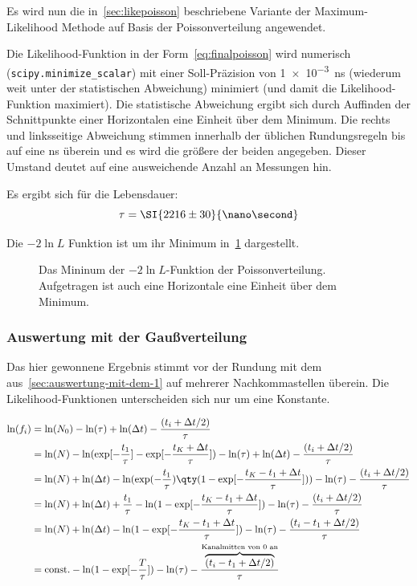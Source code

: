 \documentclass[slug=LM, room=Andreas-Schubert-Bau\,\ K\ 1A, supervisor=Anne-Sophie\ Berthold, coursedate=13.\ 12.\ 2019]{../../Lab_Report_LaTeX/lab_report}
\begin{document}
Es wird nun die in~\ref{sec:likepoisson} beschriebene Variante der
Maximum-Likelihood Methode auf Basis der Poissonverteilung angewendet.

Die Likelihood-Funktion in der Form~\ref{eq:finalpoisson} wird
numerisch (\verb|scipy.minimize_scalar|) mit einer Soll-Pr\"azision
von \SI{1e-3}{\nano\second} (wiederum weit unter der statistischen
Abweichung) minimiert (und damit die Likelihood-Funktion maximiert). Die
statistische Abweichung ergibt sich durch Auffinden der Schnittpunkte
einer Horizontalen eine Einheit \"uber dem Minimum. Die rechts und
linksseitige Abweichung stimmen innerhalb der \"ublichen
Rundungsregeln bis auf eine \si{\nano\second} \"uberein und es wird
die gr\"o\ss{}ere der beiden angegeben. Dieser Umstand deutet auf eine
ausweichende Anzahl an Messungen hin.

Es ergibt sich f\"ur die Lebensdauer:
\begin{equation}
  \label{eq:result-poisson}
  \tau = \SI{2216\pm 30}{\nano\second}
\end{equation}

Die \(-2\ln{L}\) Funktion ist um ihr Minimum
in~\ref{fig:haupt-poisson} dargestellt.

\begin{figure}[h]\centering
  
  \caption{Das Mininum der \(-2\ln{L}\)-Funktion der
    Poissonverteilung. Aufgetragen ist auch eine Horizontale eine
    Einheit \"uber dem Minimum.}
  \label{fig:haupt-poisson}
\end{figure}

\subsubsection{Auswertung mit der Gaußverteilung}
\label{sec:auw-gauss}

Das hier gewonnene Ergebnis stimmt vor der Rundung mit dem
aus~\ref{sec:auswertung-mit-dem-1} auf mehrerer Nachkommastellen
\"uberein. Die Likelihood-Funktionen unterscheiden sich nur um eine
Konstante. 

\begin{align*}
  \ln(f_i) &= \ln(N_0) - \ln(\tau) + \ln(\Delta t) - \frac{(t_i  + \Delta t/2)}{\tau}
  \\
  &= \ln(N) - \ln(\exp[-\frac{t_1}{\tau}]-\exp[-\frac{t_K+\Delta
    t}{\tau}]) - \ln(\tau) + \ln(\Delta t) - \frac{(t_i  + \Delta t/2)}{\tau} \\
  &= \ln(N) + \ln(\Delta t) - \ln(\exp(-\frac{t_1}{\tau})\qty(1-\exp[-\frac{t_K-t_1+\Delta
    t}{\tau}])) - \ln(\tau) - \frac{(t_i  + \Delta t/2)}{\tau} \\
  &= \ln(N) + \ln(\Delta t) + \frac{t_1}{\tau} - \ln(1-\exp[-\frac{t_K-t_1+\Delta
    t}{\tau}]) - \ln(\tau) - \frac{(t_i  + \Delta t/2)}{\tau} \\
  &= \ln(N) + \ln(\Delta t) - \ln(1-\exp[-\frac{t_K-t_1+\Delta
    t}{\tau}]) - \ln(\tau) - \frac{(t_i - t_1  + \Delta t/2)}{\tau} \\
  &= \text{const.} - \ln(1-\exp[-\frac{T}{\tau}]) - \ln(\tau) -
  \frac{\overbrace{(t_i - t_1  + \Delta t/2)}^{\text{Kanalmitten von 0
      an}}}{\tau} \\
\end{align*}
\end{document}
